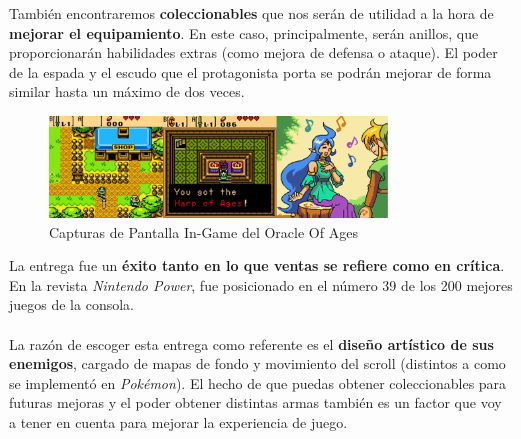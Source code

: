 También encontraremos \textbf{coleccionables} que nos serán de utilidad a la hora de \textbf{mejorar el equipamiento}. En este caso, principalmente, serán anillos, que proporcionarán habilidades extras (como mejora de defensa o ataque). El poder de la espada y el escudo que el protagonista porta se podrán mejorar de forma similar hasta un máximo de dos veces.

\begin{figure}[h]
\centering
\includegraphics[width=0.8\textwidth]{include/images/GameBoy/zelda_screens.png}
\caption{Capturas de Pantalla In-Game del Oracle Of Ages}
\label{figure:zelda_screens}
\end{figure}

La entrega fue un \textbf{éxito tanto en lo que ventas se refiere como en crítica}. En la revista \textit{Nintendo Power}, fue posicionado en el número 39 de los 200 mejores juegos de la consola.
\\ \\
La razón de escoger esta entrega como referente es el \textbf{diseño artístico de sus enemigos}, cargado de mapas de fondo y movimiento del scroll (distintos a como se implementó en \textit{Pokémon}). El hecho de que puedas obtener coleccionables para futuras mejoras y el poder obtener distintas armas también es un factor que voy a tener en cuenta para mejorar la experiencia de juego.

\cleardoublepage %




